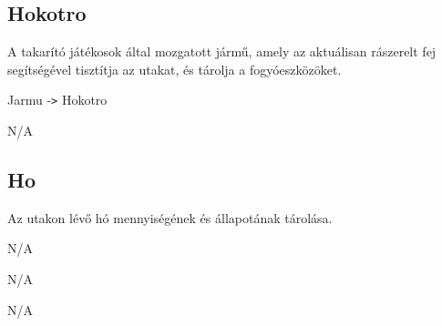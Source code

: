 \subsection{Hokotro}
\begin{class-template-responsibility}
    A takarító játékosok által mozgatott jármű, amely az aktuálisan rászerelt fej segítségével tisztítja az utakat, és tárolja a fogyóeszközöket.
\end{class-template-responsibility}
\begin{class-template-baseclass}
    Jarmu -\texttt{>} Hokotro
\end{class-template-baseclass}
\begin{class-template-interface}
    N/A
\end{class-template-interface}
\begin{class-template-attribute}
\end{class-template-attribute}
\begin{class-template-method}
\end{class-template-method}

\subsection{Ho}
\begin{class-template-responsibility}
    Az utakon lévő hó mennyiségének és állapotának tárolása.
\end{class-template-responsibility}
\begin{class-template-baseclass}
    N/A
\end{class-template-baseclass}
\begin{class-template-interface}
    N/A
\end{class-template-interface}
\begin{class-template-attribute}
\end{class-template-attribute}
\begin{class-template-method}
    N/A
\end{class-template-method}

